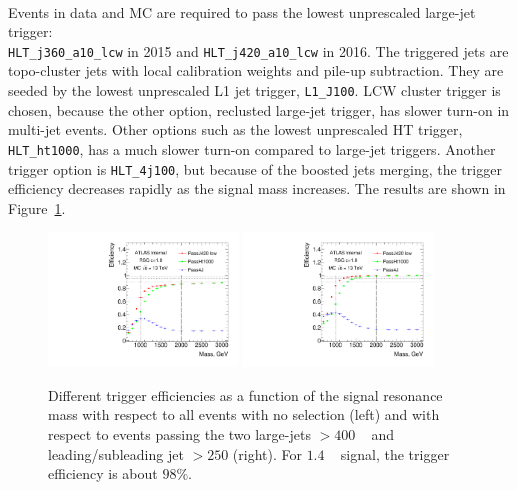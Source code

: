 \paragraph{}
Events in data and MC are required to pass the lowest unprescaled large-\R jet trigger: \\
\verb|HLT_j360_a10_lcw| in 2015 and \verb|HLT_j420_a10_lcw| in 2016. 
The triggered jets are topo-cluster jets with local calibration weights and pile-up subtraction.
They are seeded by the lowest unprescaled L1 jet trigger, \texttt{L1\_J100}. 
LCW cluster trigger is chosen, because the other option, reclusted large-\R jet trigger, has slower turn-on in multi-jet events. 
Other options such as the lowest unprescaled HT trigger, \verb|HLT_ht1000|, has a much slower turn-on compared to large-\R jet triggers.
Another trigger option is \verb|HLT_4j100|, but because of the boosted jets merging, the trigger efficiency decreases rapidly as the signal mass increases. 
The results are shown in Figure~\ref{fig:boosted-trigger-HLT}.

\begin{figure}[htbp!]
\begin{center}
  \includegraphics[width=0.45\textwidth,angle=-90]{figures/boosted/Trigger/app_trig_b77_Efficiency_PreSel.pdf}
  \includegraphics[width=0.45\textwidth,angle=-90]{figures/boosted/Trigger/app_trig_b77_Efficiency_All.pdf}
  \caption{Different trigger efficiencies as a function of the signal resonance mass with respect to all events with no selection (left) and with respect to events passing the two large-\R jets \pt $> 400$ \GeV~ and leading/subleading jet \pt $> 250$ \GeV (right). For $1.4$ \TeV~ signal, the trigger efficiency is about $98\%$.}
  \label{fig:boosted-trigger-HLT}
\end{center}
\end{figure}

